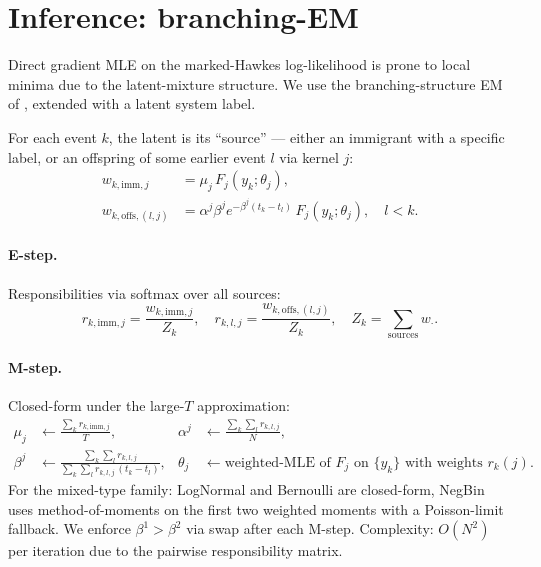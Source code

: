 \documentclass[11pt]{article}
\theoremstyle{remark}
\begin{document}
\section{Inference: branching-EM}
\label{sec:inference}

Direct gradient MLE on the marked-Hawkes log-likelihood is prone to local minima due to the latent-mixture structure. We use the branching-structure EM of \citet{veen2008estimation}, extended with a latent system label.

For each event $k$, the latent is its ``source'' --- either an immigrant with a specific label, or an offspring of some earlier event $l$ via kernel $j$:
\begin{align*}
w_{k,\mathrm{imm}, j} &= \mu_j \, F_j(y_k; \theta_j), \\
w_{k,\mathrm{offs}, (l, j)} &= \alpha^j \beta^j e^{-\beta^j (t_k - t_l)} \, F_j(y_k; \theta_j), \quad l < k.
\end{align*}

\paragraph{E-step.} Responsibilities via softmax over all sources:
\begin{equation*}
r_{k,\mathrm{imm},j} = \frac{w_{k,\mathrm{imm},j}}{Z_k}, \quad r_{k,l,j} = \frac{w_{k,\mathrm{offs},(l,j)}}{Z_k}, \quad Z_k = \sum_{\text{sources}} w_{\cdot}.
\end{equation*}

\paragraph{M-step.} Closed-form under the large-$T$ approximation:
\begin{align*}
\mu_j &\leftarrow \frac{\sum_k r_{k,\mathrm{imm},j}}{T}, &
\alpha^j &\leftarrow \frac{\sum_k \sum_l r_{k,l,j}}{N}, \\
\beta^j &\leftarrow \frac{\sum_k \sum_l r_{k,l,j}}{\sum_k \sum_l r_{k,l,j}\,(t_k - t_l)}, &
\theta_j &\leftarrow \text{weighted-MLE of $F_j$ on $\{y_k\}$ with weights } r_k(j).
\end{align*}
For the mixed-type family: LogNormal and Bernoulli are closed-form, NegBin uses method-of-moments on the first two weighted moments with a Poisson-limit fallback. We enforce $\beta^1 > \beta^2$ via swap after each M-step. Complexity: $O(N^2)$ per iteration due to the pairwise responsibility matrix.
\end{document}
